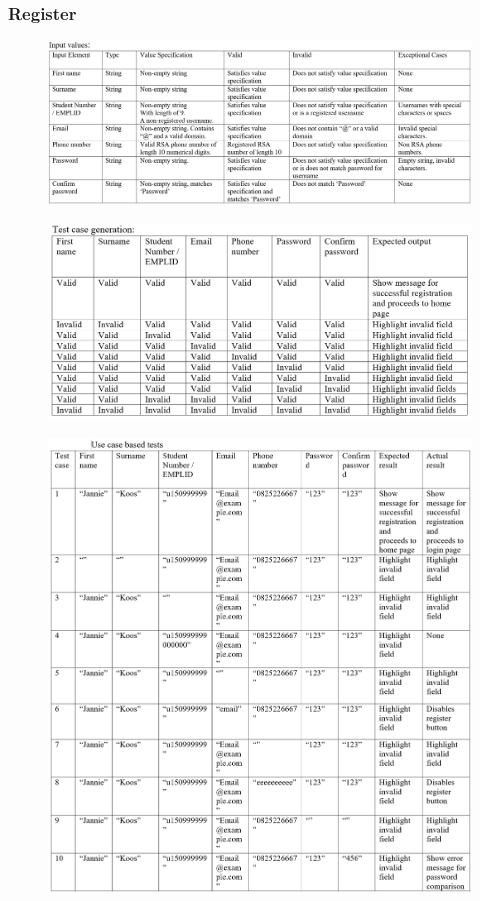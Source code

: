 \documentclass[english]{article}
\begin{document}
\subsubsection{Register}
\begin{figure}[H]
    \label{tab:example}
\hspace*{-2.5cm}
\includegraphics[width=180mm]{5.png}
\end{figure}
\begin{figure}[H]
\hspace*{-2.5cm}
\includegraphics[width=180mm]{6.png}
\end{figure}
\begin{figure}[H]
\hspace*{-2.5cm}
\includegraphics[width=180mm]{7.png}
\end{figure}
\end{document}
